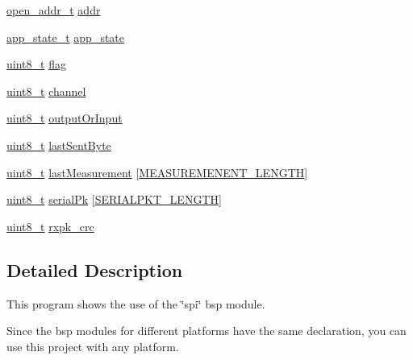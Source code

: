 \begin{DoxyCompactItemize}
\item 
\hyperlink{structopen__addr__t}{open\+\_\+addr\+\_\+t} \hyperlink{structapp__vars__t_a401332847afdfe64608f209712e75dcb}{addr}
\item 
\hyperlink{agilefox_200std__low__power__mode_200std__low__power__mode_8c_a5bb27460721cc90620d197fabf50d4bb}{app\+\_\+state\+\_\+t} \hyperlink{structapp__vars__t_a64f792bb77df8660b230434b9babf08a}{app\+\_\+state}
\item 
\hyperlink{_p_e___types_8h_aba7bc1797add20fe3efdf37ced1182c5}{uint8\+\_\+t} \hyperlink{structapp__vars__t_a4bb5b07d736217f80b8f8f80fd773d09}{flag}
\item 
\hyperlink{_p_e___types_8h_aba7bc1797add20fe3efdf37ced1182c5}{uint8\+\_\+t} \hyperlink{structapp__vars__t_a2cca4e0540bb7ae624c0ddb0033cff9d}{channel}
\item 
\hyperlink{_p_e___types_8h_aba7bc1797add20fe3efdf37ced1182c5}{uint8\+\_\+t} \hyperlink{structapp__vars__t_a3d3b3db17b7aaf0722962d7bf4c9cedd}{output\+Or\+Input}
\item 
\hyperlink{_p_e___types_8h_aba7bc1797add20fe3efdf37ced1182c5}{uint8\+\_\+t} \hyperlink{structapp__vars__t_a397235a8b7dc41ab245e3a8d80137654}{last\+Sent\+Byte}
\item 
\hyperlink{_p_e___types_8h_aba7bc1797add20fe3efdf37ced1182c5}{uint8\+\_\+t} \hyperlink{structapp__vars__t_a13b91ef4261c73df72577665d2dbd074}{last\+Measurement} \mbox{[}\hyperlink{02drv__headsup_8c_a5d66c32f79a1ee540c192fb21f115e3f}{M\+E\+A\+S\+U\+R\+E\+M\+E\+N\+E\+N\+T\+\_\+\+L\+E\+N\+G\+TH}\mbox{]}
\item 
\hyperlink{_p_e___types_8h_aba7bc1797add20fe3efdf37ced1182c5}{uint8\+\_\+t} \hyperlink{structapp__vars__t_a03d9c6352e8ea145bd5881e58446fc40}{serial\+Pk} \mbox{[}\hyperlink{02drv__headsup_8c_ad529c4e30277359b2a4cf90fbe2946f6}{S\+E\+R\+I\+A\+L\+P\+K\+T\+\_\+\+L\+E\+N\+G\+TH}\mbox{]}
\item 
\hyperlink{_p_e___types_8h_aba7bc1797add20fe3efdf37ced1182c5}{uint8\+\_\+t} \hyperlink{structapp__vars__t_a2bad33a9e988689fe1bc7d164ab56bbe}{rxpk\+\_\+crc}
\end{DoxyCompactItemize}


\subsection{Detailed Description}
This program shows the use of the \char`\"{}spi\char`\"{} bsp module. 

Since the bsp modules for different platforms have the same declaration, you can use this project with any platform.


